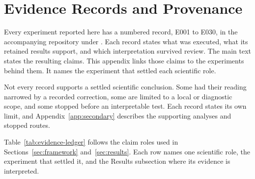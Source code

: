 \section{Evidence Records and Provenance}
\label{app:evidence-provenance}

Every experiment reported here has a numbered record, E001 to E030, in the accompanying repository under .
Each record states what was executed, what its retained results support, and which interpretation survived review.
The main text states the resulting claims.
This appendix links those claims to the experiments behind them.
It names the experiment that settled each scientific role.

Not every record supports a settled scientific conclusion.
Some had their reading narrowed by a recorded correction, some are limited to a local or diagnostic scope, and some stopped before an interpretable test.
Each record states its own limit, and Appendix~\ref{app:secondary} describes the supporting analyses and stopped routes.

Table~\ref{tab:evidence-ledger} follows the claim roles used in Sections~\ref{sec:framework} and~\ref{sec:results}.
Each row names one scientific role, the experiment that settled it, and the Results subsection where its evidence is interpreted.

